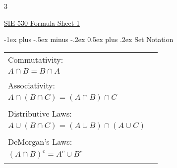 \documentclass[8pt,landscape]{extarticle}
\makeatletter
\newcommand\NumCols{3}
\renewcommand{\section}{\@startsection{section}{1}{0mm}%
                                {-1ex plus -.5ex minus -.2ex}%
                                {0.5ex plus .2ex}%
                                {\normalfont\large\bfseries}}
\makeatother
\begin{document}
\raggedright
\begin{multicols}{\NumCols}


\setlength{\premulticols}{1pt}
\setlength{\postmulticols}{1pt}
\setlength{\multicolsep}{1pt}
\setlength{\columnsep}{2pt}

\begin{center}
     \Large{\underline{SIE 530 Formula Sheet 1}} \\
\end{center}

\section{Set Notation}
\hspace*{-0.2cm}\begin{tabularx}{\textwidth/\NumCols}{ l X }
Commutativity: &
\hspace*{-0.5cm}\begin{tabular}{ l }
$A \cup B = B \cup A$ \\
$ A \cap B = B \cap A$ \\
\end{tabular}\hspace*{-1cm} \\

Associativity: &
\hspace*{-0.5cm}\begin{tabular}{ l }
$A\cup (B \cup C)=(A \cup B) \cup C$ \\
$A \cap (B \cap C) = (A \cap B) \cap C$ \\
\end{tabular} \\

Distributive Laws: &
\hspace*{-0.5cm}\begin{tabular}{ l }
$A \cap(B \cup C) = (A \cap B) \cup ( A \cap C)$ \\
$ A \cup (B \cap C) = (A \cup B) \cap (A \cup C)$ \\
\end{tabular}\\

DeMorgan's Laws: &
\hspace*{-0.5cm}\begin{tabular}{ l }
$(A \cup B)^c=A^c \cap B^c$ \\
$(A \cap B)^c=A^c\cup B^c$ \\
\end{tabular} \\
\end{tabularx}


\end{multicols}
\end{document}

